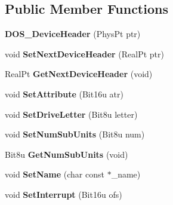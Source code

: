 \subsection*{Public Member Functions}
\begin{DoxyCompactItemize}
\item 
\hypertarget{classDOS__DeviceHeader_a32fdd1771db6f3d01ef479b119ea239b}{{\bfseries D\-O\-S\-\_\-\-Device\-Header} (Phys\-Pt ptr)}\label{classDOS__DeviceHeader_a32fdd1771db6f3d01ef479b119ea239b}

\item 
\hypertarget{classDOS__DeviceHeader_a5a747eb6d60ddd435c867fe76cd22a38}{void {\bfseries Set\-Next\-Device\-Header} (Real\-Pt ptr)}\label{classDOS__DeviceHeader_a5a747eb6d60ddd435c867fe76cd22a38}

\item 
\hypertarget{classDOS__DeviceHeader_a36397af20f9581d657d45e57bf2f519c}{Real\-Pt {\bfseries Get\-Next\-Device\-Header} (void)}\label{classDOS__DeviceHeader_a36397af20f9581d657d45e57bf2f519c}

\item 
\hypertarget{classDOS__DeviceHeader_a16bb1c870c0b1bee293ebe458c79ba78}{void {\bfseries Set\-Attribute} (Bit16u atr)}\label{classDOS__DeviceHeader_a16bb1c870c0b1bee293ebe458c79ba78}

\item 
\hypertarget{classDOS__DeviceHeader_a635a5fdb4363601e7f74c861235946fc}{void {\bfseries Set\-Drive\-Letter} (Bit8u letter)}\label{classDOS__DeviceHeader_a635a5fdb4363601e7f74c861235946fc}

\item 
\hypertarget{classDOS__DeviceHeader_a1168ac79423f779ced1a9f349c32d552}{void {\bfseries Set\-Num\-Sub\-Units} (Bit8u num)}\label{classDOS__DeviceHeader_a1168ac79423f779ced1a9f349c32d552}

\item 
\hypertarget{classDOS__DeviceHeader_a364a0f30b3103fbd689a1adab8d1dab0}{Bit8u {\bfseries Get\-Num\-Sub\-Units} (void)}\label{classDOS__DeviceHeader_a364a0f30b3103fbd689a1adab8d1dab0}

\item 
\hypertarget{classDOS__DeviceHeader_a8a98835c2df345dc4d56a911005a95bf}{void {\bfseries Set\-Name} (char const $\ast$\-\_\-name)}\label{classDOS__DeviceHeader_a8a98835c2df345dc4d56a911005a95bf}

\item 
\hypertarget{classDOS__DeviceHeader_a7c259b1a1063d663582c4111cc5e1f32}{void {\bfseries Set\-Interrupt} (Bit16u ofs)}\label{classDOS__DeviceHeader_a7c259b1a1063d663582c4111cc5e1f32}


\end{DoxyCompactItemize}
